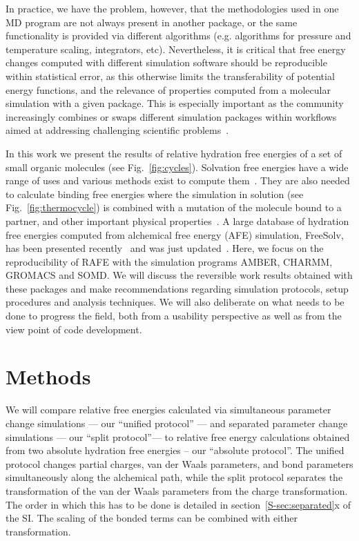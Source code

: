 \documentclass[journal=jctcce,manuscript=article]{achemso}
\begin{document}
In practice, we have the problem, however, that the methodologies
used in one MD program are not always present in another
package, or the same functionality is provided via different algorithms (e.g. algorithms for pressure and temperature 
scaling, integrators, etc).  Nevertheless, it is critical that free energy 
changes computed with different simulation software should be reproducible 
within statistical error, as this otherwise limits the transferability of 
potential energy functions, and the relevance of properties computed from a 
molecular simulation with a given package.  This is especially important as the community  
increasingly combines or swaps different simulation packages within workflows 
aimed at addressing challenging scientific 
problems~\cite{Pronk:2011:CNP:2063384.2063465, doi:10.1021/ci8000937, 
doi:10.1021/jp505332p, loeffler_fesetup:_2015, 
DBLP:journals/corr/Balasubramanian16g}.

In this work we present the results of relative hydration free
energies of a set of small organic molecules (see
Fig.~\ref{fig:cycles}).  Solvation free energies have a wide range of
uses and various methods exist to compute
them~\cite{Skyner:2015:PCCP}.  They are also needed to calculate
binding free energies where the simulation in solution (see
Fig.~\ref{fig:thermocycle}) is combined with a mutation of the
molecule bound to a partner, and other important physical
properties~\cite{Skyner:2015:PCCP}.  A large database of hydration
free energies computed from alchemical free energy (AFE) simulation, FreeSolv, 
has been presented recently~\cite{Mobley2014} and was just 
updated~\cite{doi:10.1021/acs.jced.7b00104}. Here, we focus on the 
reproducibility of RAFE with the simulation programs AMBER, CHARMM,
GROMACS and SOMD.  We will discuss the reversible work results
obtained with these packages and make recommendations
regarding simulation protocols, setup procedures and analysis
techniques.  We will also deliberate on what needs to be done to progress the 
field, both from a usability perspective as well as from the view point of code 
development.


\section{Methods}
\label{sec:methods}

We will compare relative free energies calculated via simultaneous parameter 
change simulations --- our ``unified protocol'' --- and separated parameter 
change simulations --- our ``split protocol''--- to relative free energy 
calculations obtained from two absolute hydration free energies -- our 
``absolute protocol''.  The unified protocol changes partial charges, van der Waals parameters, and bond parameters simultaneously along the alchemical path, while the split protocol separates the transformation of the van der Waals parameters from the charge transformation.  The order in which this has to be done is detailed in section~\ref{S-sec:separated}x of the SI.  The scaling of the bonded terms can be combined with either transformation.
\end{document}
